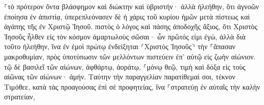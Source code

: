 \documentclass{openreader}
\begin{document}
⸀τὸ πρότερον ὄντα βλάσφημον καὶ διώκτην καὶ ὑβριστήν· ἀλλὰ ἠλεήθην, ὅτι ἀγνοῶν ἐποίησα ἐν ἀπιστίᾳ, 
ὑπερεπλεόνασεν δὲ ἡ χάρις τοῦ κυρίου ἡμῶν μετὰ πίστεως καὶ ἀγάπης τῆς ἐν Χριστῷ Ἰησοῦ. 
πιστὸς ὁ λόγος καὶ πάσης ἀποδοχῆς ἄξιος, ὅτι Χριστὸς Ἰησοῦς ἦλθεν εἰς τὸν κόσμον ἁμαρτωλοὺς σῶσαι· ὧν πρῶτός εἰμι ἐγώ, 
ἀλλὰ διὰ τοῦτο ἠλεήθην, ἵνα ἐν ἐμοὶ πρώτῳ ἐνδείξηται ⸂Χριστὸς Ἰησοῦς⸃ τὴν ⸀ἅπασαν μακροθυμίαν, πρὸς ὑποτύπωσιν τῶν μελλόντων πιστεύειν ἐπ’ αὐτῷ εἰς ζωὴν αἰώνιον. 
τῷ δὲ βασιλεῖ τῶν αἰώνων, ἀφθάρτῳ, ἀοράτῳ, ⸀μόνῳ θεῷ, τιμὴ καὶ δόξα εἰς τοὺς αἰῶνας τῶν αἰώνων· ἀμήν. 
Ταύτην τὴν παραγγελίαν παρατίθεμαί σοι, τέκνον Τιμόθεε, κατὰ τὰς προαγούσας ἐπὶ σὲ προφητείας, ἵνα ⸀στρατεύῃ ἐν αὐταῖς τὴν καλὴν στρατείαν, 
\end{document}
